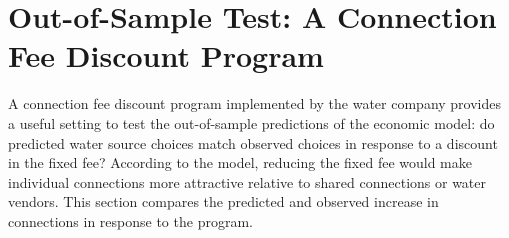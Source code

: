 \documentclass[12pt]{article}
\begin{document}
\begin{appendices}
\begin{figure}
\begin{turn}{90}
{
}
\end{turn}
\end{figure}



\section{Out-of-Sample Test: A Connection Fee Discount Program}\label{section:oostest}

A connection fee discount program implemented by the water company provides a useful setting to test the out-of-sample predictions of the economic model: do predicted water source choices match observed choices in response to a discount in the fixed fee?  According to the model, reducing the fixed fee would make individual connections more attractive relative to shared connections or water vendors.  This section compares the predicted and observed increase in connections in response to the program.  


\end{appendices}
\end{document}
